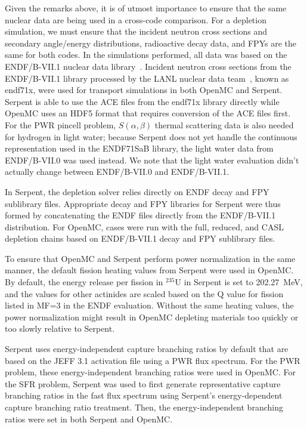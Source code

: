 \documentclass[3p,authoryear]{elsarticle}
\begin{document}
Given the remarks above, it is of utmost importance to ensure that the same
nuclear data are being used in a cross-code comparison. For a depletion
simulation, we must ensure that the incident neutron cross sections and
secondary angle/energy distributions, radioactive decay data, and FPYs are the
same for both codes. In the simulations performed, all data was based on the
ENDF/B-VII.1 nuclear data library~\citep{chadwick2011nds}. Incident neutron
cross sections from the ENDF/B-VII.1 library processed by the LANL nuclear data
team~\citep{conlin2013lanl}, known as endf71x, were used for transport
simulations in both OpenMC and Serpent. Serpent is able to use the ACE files
from the endf71x library directly while OpenMC uses an HDF5 format that requires
conversion of the ACE files first. For the PWR pincell problem,
$S(\alpha,\beta)$ thermal scattering data is also needed for hydrogen in light
water; because Serpent does not yet handle the continuous representation used in
the ENDF71SaB library, the light water data from ENDF/B-VII.0 was used instead.
We note that the light water evaluation didn't actually change between
ENDF/B-VII.0 and ENDF/B-VII.1.

In Serpent, the depletion solver relies directly on ENDF decay and FPY
sublibrary files. Appropriate decay and FPY libraries for Serpent were thus
formed by concatenating the ENDF files directly from the ENDF/B-VII.1
distribution. For OpenMC, cases were run with the full, reduced, and CASL
depletion chains based on ENDF/B-VII.1 decay and FPY sublibrary files.

To ensure that OpenMC and Serpent perform power normalization in the same
manner, the default fission heating values from Serpent were used in OpenMC. By
default, the energy release per fission in $^{235}$U in Serpent is set to
\SI{202.27}{\mega\electronvolt}, and the values for other actinides are scaled
based on the Q value for fission listed in MF=3 in the ENDF evaluation. Without
the same heating values, the power normalization might result in OpenMC
depleting materials too quickly or too slowly relative to Serpent.

Serpent uses energy-independent capture branching ratios by default that are
based on the JEFF 3.1 activation file using a PWR flux spectrum. For the PWR
problem, these energy-independent branching ratios were used in OpenMC. For the
SFR problem, Serpent was used to first generate representative capture branching
ratios in the fast flux spectrum using Serpent's energy-dependent capture
branching ratio treatment. Then, the energy-independent branching ratios were
set in both Serpent and OpenMC.
\end{document}
